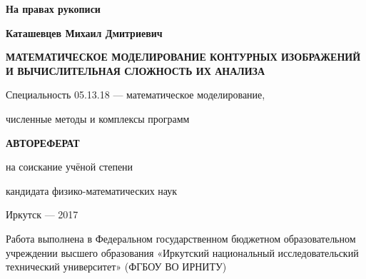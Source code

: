 \newcommand{\sfs}{\fontsize{12pt}{13pt}\selectfont}
\sfs %
\thispagestyle{empty}

\vspace{10mm}
\begin{flushright}
  \large\textbf{На правах рукописи}
\end{flushright}

\vspace{30mm}
\begin{center}
{\large\bf Каташевцев Михаил Дмитриевич}
\end{center}

\vspace{10mm}
\begin{center}
{\bf \large \MakeUppercase{Математическое моделирование контурных изображений и вычислительная сложность их анализа}
\par}

\vspace{10mm}
{\large
Специальность 05.13.18 --- математическое моделирование,\par
численные методы и комплексы программ
}

\vspace{20mm}
\large\large  \textbf{\MakeUppercase{Автореферат}}\par
{} на соискание учёной степени\par
кандидата физико-математических наук
\end{center}

\vspace{\fill}
\begin{center}
{\large Иркутск --- 2017}
\end{center}

\newpage
\thispagestyle{empty}
Работа выполнена в Федеральном государственном бюджетном 
образовательном учреждении высшего образования
«Иркутский национальный исследовательский технический университет» 
(ФГБОУ ВО ИРНИТУ)


